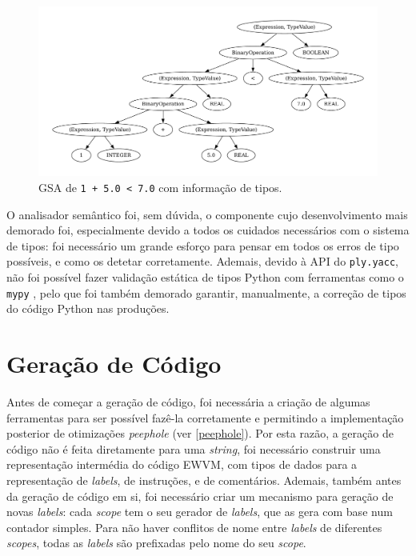\documentclass[12pt, a4paper]{article}
\begin{document}
\begin{figure}[H]
    \centering
    \includegraphics[width=\textwidth]{res/expression-types.pdf}
    \caption{GSA de \texttt{1 + 5.0 < 7.0} com informação de tipos.}
\end{figure}

O analisador semântico foi, sem dúvida, o componente cujo desenvolvimento mais demorado foi,
especialmente devido a todos os cuidados necessários com o sistema de tipos: foi necessário um
grande esforço para pensar em todos os erros de tipo possíveis, e como os detetar corretamente.
Ademais, devido à API do \texttt{ply.yacc}, não foi possível fazer validação estática de tipos
Python com ferramentas como o \texttt{mypy} \cite{mypy}, pelo que foi também demorado garantir,
manualmente, a correção de tipos do código Python nas produções.

\section{Geração de Código}

Antes de começar a geração de código, foi necessária a criação de algumas ferramentas para ser
possível fazê-la corretamente e permitindo a implementação posterior de otimizações \emph{peephole}
(ver \ref{peephole}). Por esta razão, a geração de código não é feita diretamente para uma
\emph{string}, foi necessário construir uma representação intermédia do código EWVM, com tipos de
dados para a representação de \emph{labels}, de instruções, e de comentários. Ademais, também antes
da geração de código em si, foi necessário criar um mecanismo para geração de novas \emph{labels}:
cada \emph{scope} tem o seu gerador de \emph{labels}, que as gera com base num contador simples.
Para não haver conflitos de nome entre \emph{labels} de diferentes \emph{scopes}, todas as
\emph{labels} são prefixadas pelo nome do seu \emph{scope}.
\end{document}
